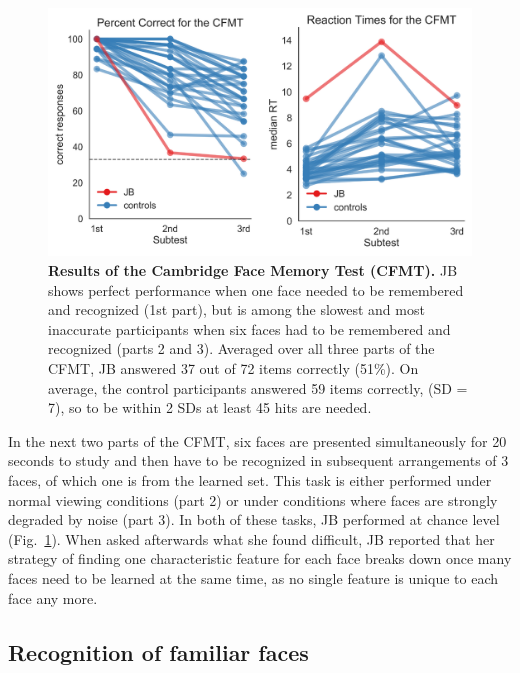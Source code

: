 \documentclass[fleqn,10pt]{SelfArx} %
\begin{document}
\begin{figure}[htbp]
	\begin{minipage}{\textwidth}
		\renewcommand{\familydefault}{\sfdefault}\normalfont
		\centering
		\includegraphics[width=\columnwidth]{../reports/figures/cambridge_main_figure.png}
		\vspace*{-3mm}
		\caption{\textbf{Results of the Cambridge Face Memory Test (CFMT).} JB shows perfect performance when one face needed to be remembered and recognized (1st part), but is among the slowest and most inaccurate participants when six faces had to be remembered and recognized (parts 2 and 3). Averaged over all three parts of the CFMT, JB answered 37 out of 72 items correctly (51\%). On average, the control participants answered 59 items correctly, (SD = 7), so to be within 2 SDs at least 45 hits are needed.}%
		\label{fig:cfmt}
	\end{minipage}
\end{figure}

In the next two parts of the CFMT, six faces are presented simultaneously for 20 seconds to study and then have to be recognized in subsequent arrangements of 3 faces, of which one is from the learned set. This task is either performed under normal viewing conditions (part 2) or under conditions where faces are strongly degraded by noise (part 3). In both of these tasks, JB performed at chance level (Fig.~\ref{fig:cfmt}). When asked afterwards what she found difficult, JB reported that her strategy of finding one characteristic feature for each face breaks down once many faces need to be learned at the same time, as no single feature is unique to each face any more. 
 

\subsection*{Recognition of familiar faces}
\end{document}
